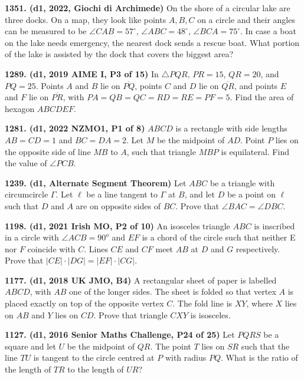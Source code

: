 \documentclass{article}
\begin{document}
\textbf{1351. (\color{red}d1\color{black}, 2022, Giochi di Archimede)} On the shore of a circular lake are three docks. On a map, they look like points $A, B, C$ on a circle and their angles can be measured to be $\angle CAB = 57^\circ$, $\angle ABC = 48^\circ$, $\angle BCA = 75^\circ$. In case a boat on the lake needs emergency, the nearest dock sends a rescue boat. What portion of the lake is assisted by the dock that covers the biggest area?

\textbf{1289. (\color{red}d1\color{black}, 2019 AIME I, P3 of 15)} In $\triangle PQR$, $PR=15$, $QR=20$, and $PQ=25$. Points $A$ and $B$ lie on $\overline{PQ}$, points $C$ and $D$ lie on $\overline{QR}$, and points $E$ and $F$ lie on $\overline{PR}$, with $PA=QB=QC=RD=RE=PF=5$. Find the area of hexagon $ABCDEF$.

\textbf{1281. (\color{red}d1\color{black}, 2022 NZMO1, P1 of 8)} \(ABCD\) is a rectangle with side lengths \(AB = CD = 1\) and \(BC = DA = 2\). Let \(M\) be the midpoint of \(AD\). Point \(P\) lies on the opposite side of line \(MB\) to \(A\), such that triangle \(MBP\) is equilateral. Find the value of \(\angle PCB\).

\textbf{1239. (\color{red}d1\color{black}, Alternate Segment Theorem)} Let \(ABC\) be a triangle with circumcircle \(\Gamma\).  Let \(\ell\) be a line tangent to \(\Gamma\) at \(B\), and let \(D\) be a point on \(\ell\) such that \(D\) and \(A\) are on opposite sides of \(BC\).  Prove that \(\angle BAC = \angle DBC\).

\textbf{1198. (\color{red}d1\color{black}, 2021 Irish MO, P2 of 10)} An isosceles triangle $ABC$ is inscribed in a circle with $\angle ACB = 90^o$ and $EF$ is a chord of the circle such that neither E nor $F$ coincide with $C$. Lines $CE$ and $CF$ meet $AB$ at $D$ and $G$ respectively. Prove that $|CE|\cdot |DG| = |EF| \cdot  |CG|$.

\textbf{1177. (\color{red}d1\color{black}, 2018 UK JMO, B4)} A rectangular sheet of paper is labelled $ABCD$, with $AB$ one of the longer sides. The sheet is folded so that vertex $A$ is placed exactly on top of the opposite vertex $C$. The fold line is $XY$, where $X$ lies on $AB$ and $Y$ lies on $CD$. Prove that triangle $CXY$ is isosceles.

\textbf{1127. (\color{red}d1\color{black}, 2016 Senior Maths Challenge, P24 of 25)} Let $PQRS$ be a square and let $U$ be the midpoint of $QR$.  The point $T$ lies on $SR$ such that the line $TU$ is tangent to the circle centred at $P$ with radius $PQ$. What is the ratio of the length of $TR$ to the length of $UR$?
\end{document}
